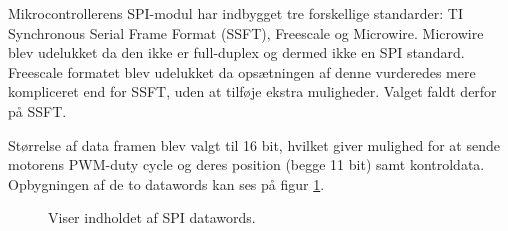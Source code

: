 Mikrocontrollerens SPI-modul har indbygget tre forskellige standarder: TI Synchronous Serial Frame Format (SSFT), Freescale og Microwire. 
Microwire blev udelukket da den ikke er full-duplex og dermed ikke en SPI standard. 
Freescale formatet blev udelukket da opsætningen af denne vurderedes mere kompliceret end for SSFT,
uden at tilføje ekstra muligheder.
Valget faldt derfor på SSFT.

Størrelse af data framen blev valgt til 16 bit, hvilket giver mulighed for at sende
motorens PWM-duty cycle og deres position (begge 11 bit) samt kontroldata.
Opbygningen af de to datawords kan ses på figur \ref{fig:protokol1}.

\begin{figure}[h!]
\centering
{}
\qquad
{}
\caption[Indholdet af SPI datawords]{Viser indholdet af SPI datawords. }
\label{fig:protokol1}
\end{figure}

